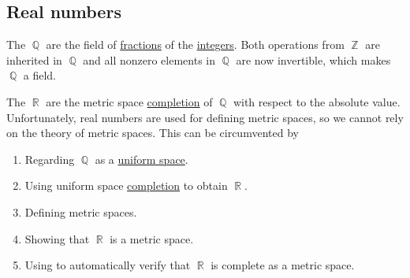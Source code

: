 \subsection{Real numbers}\label{subsec:real_numbers}

\begin{definition}\label{def:set_of_rational_numbers}
  The  \( \BbbQ \) are the field of \hyperref[def:field_of_fractions]{fractions} of the \hyperref[def:set_of_integers]{integers}. Both operations from \( \BbbZ \) are inherited in \( \BbbQ \) and all nonzero elements in \( \BbbQ \) are now invertible, which makes \( \BbbQ \) a field.
\end{definition}

\begin{definition}\label{def:set_of_real_numbers}
  The  \( \BbbR \) are the metric space \hyperref[def:complete_metric_space]{completion} of \( \BbbQ \) with respect to the absolute value. Unfortunately, real numbers are used for defining metric spaces, so we cannot rely on the theory of metric spaces. This can be circumvented by
  \begin{enumerate}
    \item Regarding \( \BbbQ \) as a \hyperref[def:uniform_space]{uniform space}.
    \item Using uniform space \hyperref[thm:uniform_space_completion]{completion} to obtain \( \BbbR \).
    \item Defining metric spaces.
    \item Showing that \( \BbbR \) is a metric space.
    \item Using  to automatically verify that \( \BbbR \) is complete as a metric space.
  \end{enumerate}
\end{definition}

